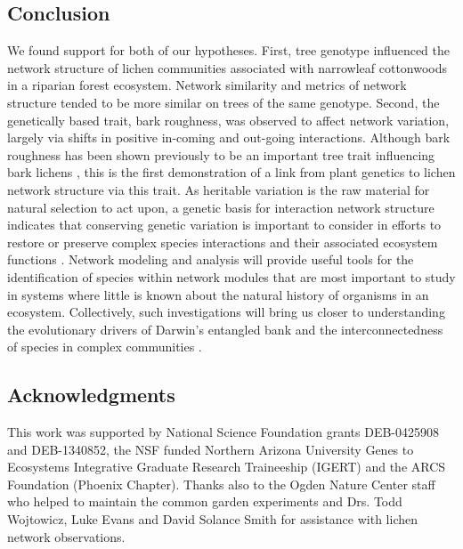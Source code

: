 \documentclass[fleqn,12pt]{olplainarticle}
\begin{document}
\subsection*{Conclusion}

We found support for both of our hypotheses. First, tree genotype
influenced the network structure of lichen communities associated with
narrowleaf cottonwoods in a riparian forest ecosystem. Network
similarity and metrics of network structure tended to be more similar
on trees of the same genotype. Second, the genetically based trait,
bark roughness, was observed to affect network variation, largely via
shifts in positive in-coming and out-going interactions. Although bark
roughness has been shown previously to be an important tree trait
influencing bark lichens \citep{Lamit2015a}, this is the first
demonstration of a link from plant genetics to lichen network
structure via this trait. As heritable variation is the raw material
for natural selection to act upon, a genetic basis for interaction
network structure indicates that conserving genetic variation is
important to consider in efforts to restore or preserve complex
species interactions and their associated ecosystem functions \citep{
  Whitham2012, Evans2013, Barraclough2015,
  Whitham2020IntraspecificEvolution}. Network modeling and analysis
will provide useful tools for the identification of species within
network modules that are most important to study in systems where
little is known about the natural history of organisms in an
ecosystem. Collectively, such investigations will bring us closer to
understanding the evolutionary drivers of Darwin's entangled bank and
the interconnectedness of species in complex communities
\citep{Darwin1859, Dattilo2016fix}.



\subsection*{Acknowledgments}

This work was supported by National Science Foundation grants
DEB-0425908 and DEB-1340852, the NSF funded Northern Arizona
University Genes to Ecosystems Integrative Graduate Research
Traineeship (IGERT) and the ARCS Foundation (Phoenix Chapter). Thanks
also to the Ogden Nature Center staff who helped to maintain the
common garden experiments and Drs. Todd Wojtowicz, Luke Evans and
David Solance Smith for assistance with lichen network observations.

\end{document}
